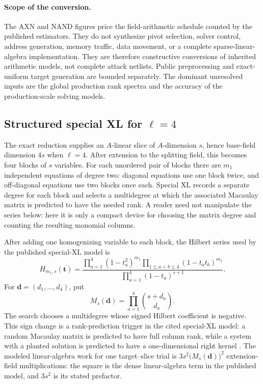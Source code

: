 \documentclass[11pt]{article}
\begin{document}
\paragraph{Scope of the conversion.}
The AXN and NAND figures price the field-arithmetic schedule counted by the
published estimators.  They do not synthesize pivot selection, solver control,
address generation, memory traffic, data movement, or a complete
sparse-linear-algebra implementation.  They are therefore constructive
conversions of inherited arithmetic models, not complete attack netlists.
Public preprocessing and exact-uniform target generation are bounded
separately.  The dominant unresolved inputs are the global production rank
spectra and the accuracy of the production-scale solving models.

\subsection{Structured special XL for \texorpdfstring{$\ell=4$}{l=4}}\label{sec:special-xl}

The exact reduction supplies an $A$-linear slice of $A$-dimension $s$,
hence base-field dimension $4s$ when $\ell=4$.  After extension to the
splitting field, this becomes four blocks of $s$ variables.  For each unordered pair of blocks there are $m_1$ independent equations
of degree two: diagonal equations use one block twice, and off-diagonal
equations use two blocks once each.  Special XL records a separate degree for
each block and selects a multidegree
at which the associated Macaulay matrix is predicted to have the needed rank.
A reader need not manipulate the series below: here it is only a compact device
for choosing the matrix degree and counting the resulting monomial columns.

After adding one homogenizing variable to each block, the Hilbert series used
by the published special-XL model is
\begin{equation}\label{eq:hilbert-series}
 H_{m_1,s}(\mathbf t)=
 \frac{\prod_{a=1}^{4}(1-t_a^2)^{m_1}
       \prod_{1\le a<b\le4}(1-t_at_b)^{m_1}}
      {\prod_{a=1}^{4}(1-t_a)^{s+1}}.
\end{equation}
For $\mathbf d=(d_1,\ldots,d_4)$, put
\begin{equation}\label{eq:macaulay-size}
 M_s(\mathbf d)=\prod_{a=1}^{4}\binom{s+d_a}{d_a}.
\end{equation}
The search chooses a multidegree whose signed Hilbert coefficient is
negative.  This sign change is a rank-prediction trigger in the cited
special-XL model: a random Macaulay matrix is predicted to have full column
rank, while a system with a planted solution is predicted to have a
one-dimensional right kernel
\cite{Cabarcas2025SNOVA}.  The modeled linear-algebra work for one target--slice trial is
$3s^2\bigl(M_s(\mathbf d)\bigr)^2$ extension-field multiplications: the square is the
dense linear-algebra term in the published model, and $3s^2$ is its stated
prefactor.
\end{document}
